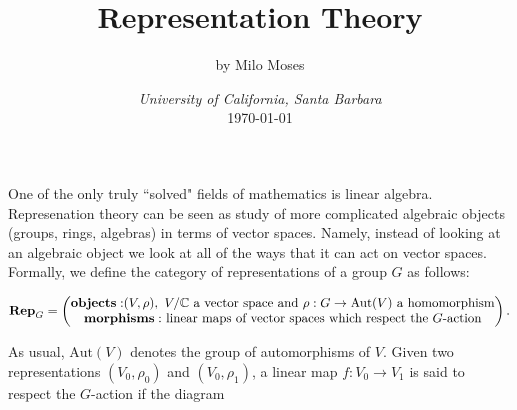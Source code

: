 \documentclass{article}
\title{Representation Theory}
\author{by Milo Moses}
\date{\textit{University of California, Santa Barbara} \\ [2ex] \today}
\theoremstyle{definition}
\numberwithin{figure}{section}
\begin{document}
\maketitle

\newcommand{\RR}{\mathbb{R}}
\newcommand{\HH}{\mathbb{H}}
\newcommand{\NN}{\mathbb{N}}
\newcommand{\QQ}{\mathbb{Q}}
\newcommand{\CC}{\mathbb{C}}
\newcommand{\FF}{\mathbb{F}}
\newcommand{\ZZ}{\mathbb{Z}}
\newcommand{\Zcal}{\mathcal{Z}}
\newcommand{\Ncal}{\mathcal{N}}
\newcommand{\LL}{\mathscr{L}}
\newcommand{\TT}{\mathcal{T}}
\newcommand{\Ccat}{\mathscr{C}}
\newcommand{\Dcat}{\mathscr{D}}
\newcommand{\st}{\,\,\mathrm{s.t}\,\,}
\newcommand{\mm}{\mathfrak{m}}
\newcommand{\pp}{\mathfrak{p}}
\newcommand{\Hom}{\mathrm{Hom}}
\newcommand{\Aut}{\mathrm{Aut}}
\newcommand{\Frac}{\mathrm{Frac}}
\newcommand{\tr}{\mathrm{tr}}
\newcommand{\res}{\mathrm{res}}
\newcommand{\im}{\mathrm{im}}
\newcommand{\coker}{\mathrm{coker}}
\newcommand{\SL}{\mathrm{SL}}
\newcommand{\End}{\mathrm{End}}
\newcommand{\Rep}{\bold{Rep}}
\newcommand{\Set}{\bold{Set}}
\newcommand{\Vecc}{\bold{Vec}}
\newcommand{\0}{\left|0\right>}
\newcommand{\1}{\left|1\right>}
\newcommand{\nullclass}{\left|\bold{0}\right>}
\newcommand{\alphaclass}{\left|\alpha\right>}
\newcommand{\betaclass}{\left|\beta\right>}
\newcommand{\alphabetaclass}{\left|\alpha\beta\right>}
\newcommand{\ppsi}{\left|\psi\right>}
\newcommand{\bigleadsto}{\mathlarger{\mathlarger{\mathlarger{\leadsto}}}}
\newcommand{\vin}{\rotatebox[origin=c]{-90}{$\in$}}

One of the only truly ``solved" fields of mathematics is linear algebra. Represenation theory can be seen as study of more complicated algebraic objects (groups, rings, algebras) in terms of vector spaces. Namely, instead of looking at an algebraic object we look at all of the ways that it can act on vector spaces. Formally, we define the category of representations of a group $G$ as follows:

$$\Rep_{G}=
\begin{pmatrix}
\bold{objects:  }(V,\rho),\,\, V/\CC\text{ a vector space and }\rho:G\to \Aut(V)\text{ a homomorphism}\\
\bold{morphisms:} \text{ linear maps of vector spaces which respect the }G\text{-action}
\end{pmatrix}.
$$

As usual, $\Aut(V)$ denotes the group of automorphisms of $V$. Given two representations $(V_0,\rho_0)$ and $(V_0,\rho_1)$, a linear map $f:V_0\to V_1$ is said to respect the $G$-action if the diagram
\end{document}
